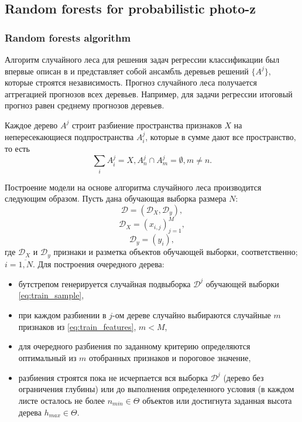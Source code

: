 \documentclass[fleqn,usenatbib]{mnras}
\begin{document}
\subsection{Random forests for probabilistic photo-z}

\subsubsection{Random forests algorithm}
Алгоритм случайного леса для решения задач регрессии классификации был впервые описан в \citep{2001MachL..45....5B} и представляет собой ансамбль деревьев решений $\{A^j\}$, которые строятся независимость. Прогноз случайного леса получается аггрегацией прогнозов всех деревьев. Например, для задачи регрессии итоговый прогноз равен среднему прогнозов деревьев.

Каждое дерево $A^j$ строит разбиение пространства признаков $X$ на непересекающиеся подпространства $A^j_i$, которые в сумме дают все пространство, то есть
\begin{equation}
    \sum_i A^j_i = X, A^j_n \cap A^j_m = \emptyset, m \neq n.
\end{equation}

Построение модели на основе алгоритма случайного леса производится следующим образом. Пусть дана обучающая выборка размера $N$:
\begin{equation}\label{eq:train_sample}
    \mathcal{D} = (\mathcal{D}_X, \mathcal{D}_y),
\end{equation}
\begin{equation}\label{eq:train_features}
    \mathcal{D}_X = (x_{i,j})_{j=1}^M,
\end{equation}
\begin{equation}\label{eq:train_target}
    \mathcal{D}_y = (y_i),
\end{equation}
где $\mathcal{D}_X$ и $\mathcal{D}_y$ признаки и разметка объектов обучающей выборки, соответственно; $i=\overline{1, N}$. Для построения очередного дерева:
\begin{itemize}
    \item бутстрепом генерируется случайная подвыборка $\mathcal{D}^j$ обучающей выборки \eqref{eq:train_sample},
    \item при каждом разбиении в $j$-ом дереве случайно выбираются случайные $m$ признаков из \eqref{eq:train_features}, $m < M$,
    \item для очередного разбиения по заданному критерию определяются оптимальный из $m$ отобранных признаков и пороговое значение,
    \item разбиения строятся пока не исчерпается вся выборка $\mathcal{D}^j$ (дерево без ограничения глубины) или до выполнения определенного условия (в каждом листе осталось не более $n_{min} \in \Theta$ объектов или достигнута заданная высота дерева $h_{max} \in \Theta$.
\end{itemize}
\end{document}
